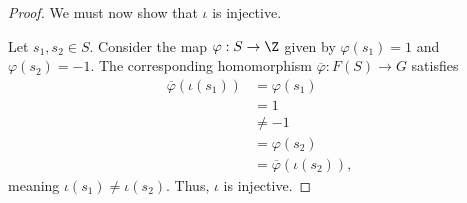 \documentclass[10pt]{mypackage}
\begin{document}
\begin{proof}
  We must now show that $\iota$ is injective.\newline

  Let $s_1,s_2\in S$. Consider the map $\varphi: S\rightarrow \Z$ given by $\varphi\left(s_1\right) = 1$ and $\varphi\left(s_2\right) = -1$. The corresponding homomorphism $\overline{\varphi}: F(S)\rightarrow G$ satisfies
  \begin{align*}
    \overline{\varphi}\left(\iota\left(s_1\right)\right) &= \varphi\left(s_1\right)\\
                                                         &= 1\\
                                                         &\neq -1\\
                                                         &= \varphi\left(s_2\right)\\
                                                         &= \overline{\varphi}\left(\iota\left(s_2\right)\right),
  \end{align*}
  meaning $\iota\left(s_1\right)\neq \iota\left(s_2\right)$. Thus, $\iota$ is injective.
\end{proof}
\end{document}
